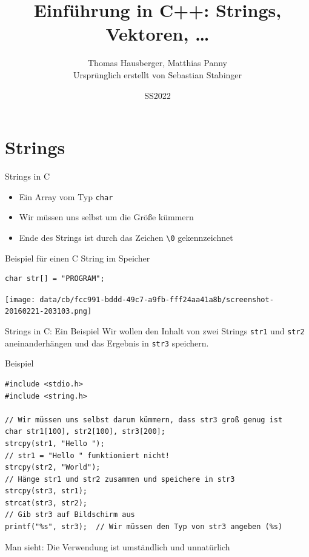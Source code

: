 \documentclass[presentation]{beamer}
\author{Thomas Hausberger, Matthias Panny \\ Ursprünglich erstellt von Sebastian Stabinger}
\date{SS2022}
\title{Einführung in C++: Strings, Vektoren, \ldots{}}
\begin{document}
\maketitle

\section{Strings}
\label{sec:org34863a6}
\begin{frame}[label={sec:orgbbff279},fragile]{Strings in C}
 \begin{itemize}
\item Ein Array vom Typ {\color{solarizedYellow}\verb!char!}
\item Wir müssen uns selbst um die Größe kümmern
\item Ende des Strings ist durch das Zeichen {\color{solarizedYellow}\verb!\0!} gekennzeichnet
\end{itemize}
\begin{block}{Beispiel für einen C String im Speicher}
\begin{verbatim}
char str[] = "PROGRAM";
\end{verbatim}
\begin{center}
\texttt{[image: data/cb/fcc991-bddd-49c7-a9fb-fff24aa41a8b/screenshot-20160221-203103.png]}
\end{center}
\end{block}
\end{frame}
\begin{frame}[label={sec:orgcf6e780},fragile]{Strings in C: Ein Beispiel}
 Wir wollen den Inhalt von zwei Strings {\color{solarizedYellow}\verb!str1!} und {\color{solarizedYellow}\verb!str2!}
aneinanderhängen und das Ergebnis in {\color{solarizedYellow}\verb!str3!} speichern.
\begin{exampleblock}{Beispiel}
\begin{verbatim}
#include <stdio.h>
#include <string.h>

// Wir müssen uns selbst darum kümmern, dass str3 groß genug ist
char str1[100], str2[100], str3[200];
strcpy(str1, "Hello ");
// str1 = "Hello " funktioniert nicht!
strcpy(str2, "World");
// Hänge str1 und str2 zusammen und speichere in str3
strcpy(str3, str1);
strcat(str3, str2);
// Gib str3 auf Bildschirm aus
printf("%s", str3);  // Wir müssen den Typ von str3 angeben (%s)
\end{verbatim}
\end{exampleblock}
Man sieht: Die Verwendung ist \alert{umständlich und unnatürlich}
\end{frame}
\end{document}
